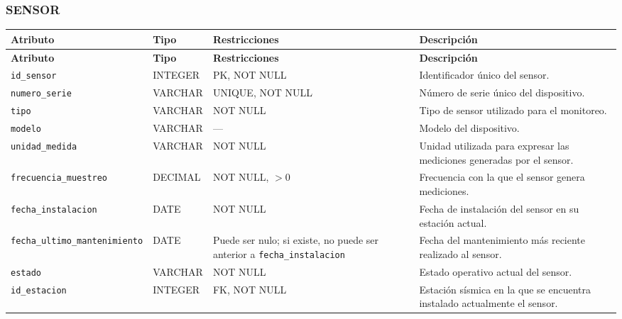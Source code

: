 \documentclass[12pt,a4paper]{article}
\begin{document}

\subsubsection*{SENSOR}

{
\small
\setlength{\tabcolsep}{3pt}
\renewcommand{\arraystretch}{1.15}

\begin{longtable}{
    >{\raggedright\arraybackslash}p{4.25cm}
    >{\raggedright\arraybackslash}p{2.65cm}
    >{\raggedright\arraybackslash}p{3.85cm}
    >{\raggedright\arraybackslash}p{3.85cm}
}
\toprule
\textbf{Atributo} &
\textbf{Tipo} &
\textbf{Restricciones} &
\textbf{Descripción} \\
\midrule
\endfirsthead

\toprule
\textbf{Atributo} &
\textbf{Tipo} &
\textbf{Restricciones} &
\textbf{Descripción} \\
\midrule
\endhead

\texttt{id\_\allowbreak{}sensor} &
INTEGER &
PK, NOT NULL &
Identificador único del sensor. \\

\texttt{numero\_\allowbreak{}serie} &
VARCHAR &
UNIQUE, NOT NULL &
Número de serie único del dispositivo. \\

\texttt{tipo} &
VARCHAR &
NOT NULL &
Tipo de sensor utilizado para el monitoreo. \\

\texttt{modelo} &
VARCHAR &
--- &
Modelo del dispositivo. \\

\texttt{unidad\_\allowbreak{}medida} &
VARCHAR &
NOT NULL &
Unidad utilizada para expresar las mediciones generadas por el sensor. \\

\texttt{frecuencia\_\allowbreak{}muestreo} &
DECIMAL &
NOT NULL, $>0$ &
Frecuencia con la que el sensor genera mediciones. \\

\texttt{fecha\_\allowbreak{}instalacion} &
DATE &
NOT NULL &
Fecha de instalación del sensor en su estación actual. \\

\texttt{fecha\_\allowbreak{}ultimo\_\allowbreak{}mantenimiento} &
DATE &
Puede ser nulo; si existe, no puede ser anterior a \texttt{fecha\_\allowbreak{}instalacion} &
Fecha del mantenimiento más reciente realizado al sensor. \\

\texttt{estado} &
VARCHAR &
NOT NULL &
Estado operativo actual del sensor. \\

\texttt{id\_\allowbreak{}estacion} &
INTEGER &
FK, NOT NULL &
Estación sísmica en la que se encuentra instalado actualmente el sensor. \\

\bottomrule
\end{longtable}
}
\end{document}
